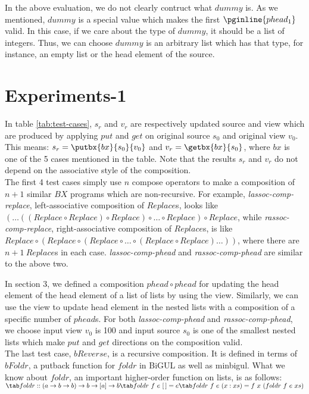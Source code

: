 In the above evaluation, we do not clearly contruct what $dummy$ is. As we mentioned, $dummy$ is a special value which makes the first $\pginline{phead_1}$ valid. In this case, if we care about the type of $dummy$, it should be a list of integers. Thus, we can choose $dummy$ is an arbitrary list which has that type, for instance, an empty list or the head element of the source.

\section{Experiments-1}
In table \ref{tab:test-cases}, $s_r$ and $v_r$ are respectively updated source and view which are produced by applying $put$ and $get$ on original source $s_0$ and original view $v_0$. This means: $s_r = \putbx{bx}{s_0}{v_0}$ and $v_r = \getbx{bx}{s_0}$, where $bx$ is one of the 5 cases mentioned in the table. Note that the results $s_r$ and $v_r$ do not depend on the associative style of the composition.\\

The first 4 test cases simply use $n$ compose operators to make a composition of $n + 1$ similar $BX$ programs which are non-recursive. For example, \textit{lassoc-comp-replace}, left-associative composition of $Replace$s, looks like $(\ldots((Replace \circ Replace) \circ Replace) \circ \ldots \circ Replace) \circ Replace$, while \textit{rassoc-comp-replace}, right-associative composition of $Replace$s, is like $Replace \circ (Replace \circ (Replace \circ \ldots \circ (Replace \circ Replace)\ldots))$, where there are $n + 1 \ Replace$s in each case. \textit{lassoc-comp-phead} and \textit{rassoc-comp-phead} are similar to the above two.

In section 3, we defined a composition $phead \circ phead$ for updating the head element of the head element of a list of lists by using the view. Similarly, we can use the view to update head element in the nested lists with a composition of a specific number of $phead$s. For both \textit{lassoc-comp-phead} and \textit{rassoc-comp-phead}, we choose input view $v_0$ is 100 and input source $s_0$ is one of the smallest nested lists which make $put$ and $get$ directions on the composition valid.\\

The last test case, $bReverse$, is a recursive composition. It is defined in terms of $bFoldr$, a putback function for $foldr$ in BiGUL as well as minbigul. What we know about $foldr$, an important higher-order function on lists, is as follows:\\
    $\tab foldr :: (a \to b \to b) \to b \to [a] \to b\\
    \tab foldr \ f \ e \ [\,] = e\\
    \tab foldr \ f \ e \ (x:xs) = f \ x \ (foldr \ f \ e \ xs)$

